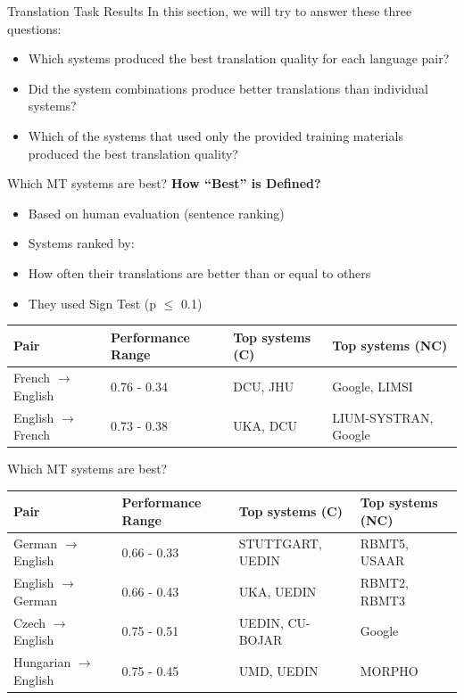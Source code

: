 \begin{frame}{Translation Task Results}
In this section, we will try to answer these three questions:

\begin{itemize}
    \item Which systems produced the best translation quality for each language pair?
    \item Did the system combinations produce better translations than individual systems?
    \item Which of the systems that used only the provided training materials produced the best translation quality?
\end{itemize}
\end{frame}

\begin{frame}{Which MT systems are best?}
\textbf{How “Best” is Defined?}
\begin{itemize}
    \item Based on human evaluation (sentence ranking)
    \item Systems ranked by:
    \item How often their translations are better than or equal to others
    \item They used Sign Test (p \( \leq \) 0.1)
\end{itemize}

\vspace{0.5em}

\begin{table}
\centering
    \begin{tabularx}{\textwidth}{lLLL}
\toprule
Pair & Performance Range & Top systems (C) & Top systems (NC) \\
\midrule
French $\rightarrow$ English & 0.76 - 0.34 & DCU, JHU & Google, LIMSI \\
English $\rightarrow$ French & 0.73 - 0.38 & UKA, DCU & LIUM-SYSTRAN, Google \\
\bottomrule
\end{tabularx}
\end{table}
\end{frame}

\begin{frame}{Which MT systems are best?}
\begin{table}
\centering
    \begin{tabularx}{\textwidth}{lLLL}
\toprule
Pair & Performance Range & Top systems (C) & Top systems (NC) \\
\midrule
German $\rightarrow$ English & 0.66 - 0.33 & STUTTGART, UEDIN & RBMT5, USAAR \\
English $\rightarrow$ German & 0.66 - 0.43 & UKA, UEDIN & RBMT2, RBMT3 \\
Czech $\rightarrow$ English & 0.75 - 0.51 & UEDIN, CU-BOJAR & Google \\
Hungarian $\rightarrow$ English & 0.75 - 0.45 & UMD, UEDIN & MORPHO \\
\bottomrule
\end{tabularx}
\end{table}
\end{frame}

